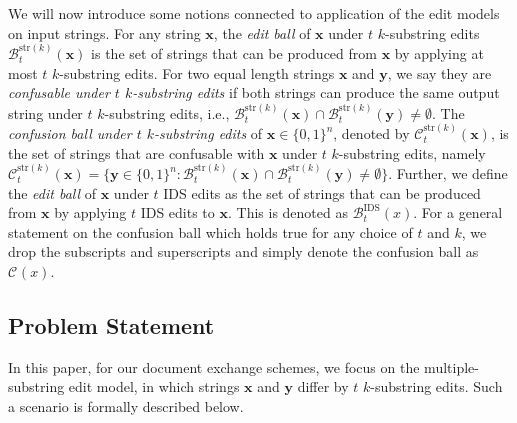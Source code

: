 \documentclass[onecolumn]{IEEEtran}
\newcommand{\bl}{n}
\newcommand{\numedits}{t}
\newcommand{\editsize}{k}
\newcommand{\confball}[3]{\mathcal{C}_{#1}^{#2}(#3)}
\newcommand{\editball}[3]{\mathcal{B}_{#1}^{#2}(#3)}
\newcommand{\insdel}{IDS\xspace}
\newcommand{\bfx}{{\mathbf{ x}}}
\newcommand{\bfy}{{\mathbf{ y}}}
\newcommand{\vr}[1]{{\color{red} {\small [VR: #1]} }}
\begin{document}

We will now introduce some notions connected to application of the edit models on input strings. For any string $\mathbf{x}$, the \emph{edit ball} of $\mathbf{x}$ under $\numedits$ $\editsize$-substring edits $\editball{\numedits}{\mathrm{str}(\editsize)}{\bfx}$  is the set of strings that can be produced from $\mathbf{x}$ by applying at most $\numedits$ $\editsize$-substring edits. For two equal length strings $\mathbf{x}$ and $\mathbf{y}$, we say they are \emph{confusable under $\numedits$ $\editsize$-substring edits} if both strings can produce the same output string under $\numedits$ $\editsize$-substring edits, i.e., $\editball{\numedits}{\mathrm{str}(\editsize)}{\bfx} \cap \editball{\numedits}{\mathrm{str}(\editsize)}{\bfy} \neq \emptyset$. The \emph{confusion ball under $\numedits$ $\editsize$-substring edits} of $\mathbf{x} \in \{0,1\}^\bl$, denoted by $\confball{\numedits}{\mathrm{str}(\editsize)}{\mathbf{x}}$, is the set of strings that are confusable with $\mathbf{x}$ under $\numedits$ $\editsize$-substring edits, namely $\confball{\numedits}{\mathrm{str}(\editsize)}{\mathbf{x}} = \{\bfy \in \{0,1\}^\bl : \editball{\numedits}{\mathrm{str}(\editsize)}{\bfx} \cap \editball{\numedits}{\mathrm{str}(\editsize)}{\bfy} \neq \emptyset\}$.
Further, we define the \emph{edit ball} of $\mathbf{x}$ under $t$ \insdel edits as the set of strings that can be produced from $\mathbf{x}$ by applying $t$ \insdel edits to $\bfx$. This is  denoted as $\editball{t}{\mathrm{\insdel}}{x}$.
For a general statement on the confusion ball which holds true for any choice of $\numedits$ and $\editsize$, we drop the subscripts and superscripts and simply denote the confusion ball as $\confball{}{}{x}$.

\subsection{Problem Statement}
In this paper, for our document exchange schemes, we focus on the multiple-substring edit model, in which strings $\mathbf{x}$ and $\mathbf{y}$ differ by $\numedits$ $\editsize$-substring edits. Such a scenario is formally described below.
\end{document}
